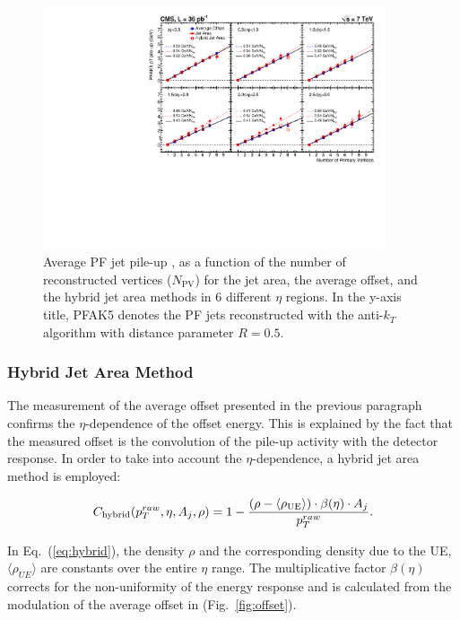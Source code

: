 \begin{figure}[ht!]
  \begin{center}
    \includegraphics[width=0.9\textwidth]{Figures/JEC/PileUpComparison_NoPFNoPU_PF}
    \caption{Average PF jet pile-up \pt, as a function of the number of reconstructed vertices ($N_\text{PV}$) for the jet area, the average offset, and the hybrid jet area methods in 6 different $\eta$ regions. In the y-axis title, PFAK5 denotes the PF jets reconstructed with the anti-$k_T$ algorithm with distance parameter $R=0.5$.}
    \label{fig:pileupPF}
  \end{center}
\end{figure}

\subsubsection{Hybrid Jet Area Method}

The measurement of the average offset presented in the previous paragraph confirms the $\eta$-dependence of the offset energy. This is explained by the fact that the measured offset is the convolution of the pile-up activity with the detector response. In order to take into account the $\eta$-dependence, a hybrid jet area method is employed:

\begin{equation}
\label{eq:hybrid}
  C_\text{hybrid}(p_{{T}}^{raw},\eta,A_j,\rho) = 1-\frac{(\rho-\langle\rho_\text{UE}\rangle)\cdot\beta(\eta)\cdot A_j}{p_{{T}}^{raw}}.
\end{equation}

In Eq.~(\ref{eq:hybrid}), the \pt density $\rho$ and the corresponding density due to the UE, $\langle\rho_{UE}\rangle$ are constants over the entire $\eta$ range. The multiplicative factor $\beta(\eta)$ corrects for the non-uniformity of the energy response and is calculated from the modulation of the average offset in \pt (Fig.~\ref{fig:offset}).

